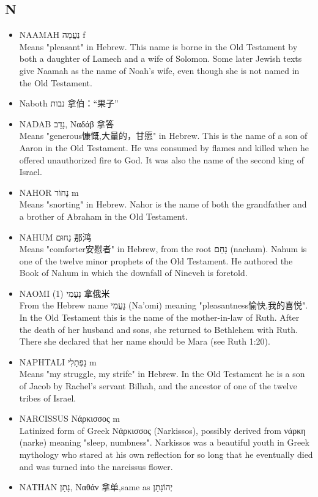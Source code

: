 \subsection{N}
\begin{itemize}
\itemsep-.5em 
\item NAAMAH נַעֲמָה f \\
Means "pleasant" in Hebrew. This name is borne in the Old Testament by both a daughter of Lamech and a wife of Solomon. Some later Jewish texts give Naamah as the name of Noah's wife, even though she is not named in the Old Testament.
\item Naboth נבות 拿伯：“果子”
\item NADAB נָדָב, Ναδάβ 拿答 \\
Means "generous慷慨,大量的，甘愿" in Hebrew. This is the name of a son of Aaron in the Old Testament. He was consumed by flames and killed when he offered unauthorized fire to God. It was also the name of the second king of Israel.
\item NAHOR נָחוֹר m \\
Means "snorting" in Hebrew. Nahor is the name of both the grandfather and a brother of Abraham in the Old Testament.
\item NAHUM נַחוּם 那鸿 \\
Means "comforter安慰者" in Hebrew, from the root נָחַם (nacham). Nahum is one of the twelve minor prophets of the Old Testament. He authored the Book of Nahum in which the downfall of Nineveh is foretold.
\item NAOMI (1) נָעֳמִי 拿俄米 \\
From the Hebrew name נָעֳמִי (Na'omi) meaning "pleasantness愉快,我的喜悦". In the Old Testament this is the name of the mother-in-law of Ruth. After the death of her husband and sons, she returned to Bethlehem with Ruth. There she declared that her name should be Mara (see Ruth 1:20).
\item NAPHTALI נַפְתָלִי m \\
Means "my struggle, my strife" in Hebrew. In the Old Testament he is a son of Jacob by Rachel's servant Bilhah, and the ancestor of one of the twelve tribes of Israel.
\item NARCISSUS Νάρκισσος m \\
Latinized form of Greek Νάρκισσος (Narkissos), possibly derived from νάρκη (narke) meaning "sleep, numbness". Narkissos was a beautiful youth in Greek mythology who stared at his own reflection for so long that he eventually died and was turned into the narcissus flower.
\item NATHAN נָתָן, Ναθάν 拿单,same as יְהוֹנָתָן \\

\end{itemize}
